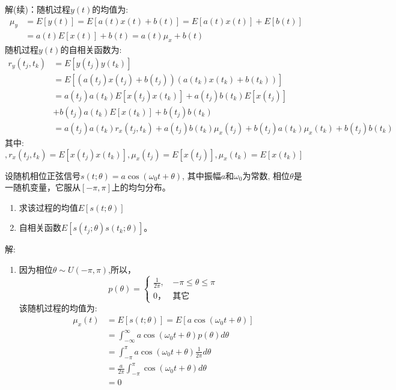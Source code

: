 \begin{frame}
解(续)：随机过程$y(t)$的均值为:
\begin{align*}
\mu_y&=E[y(t)]=E[a(t)x(t)+b(t)]=E[a(t)x(t)]+E[b(t)]\\
&=a(t)E[x(t)]+b(t)=a(t)\mu_x+b(t)
\end{align*}
随机过程$y(t)$的自相关函数为:
\begin{align*}
r_y(t_j,t_k)&=E[y(t_j)y(t_k)]\\
&=E[(a(t_j)x(t_j)+b(t_j))(a(t_k)x(t_k)+b(t_k))]\\
&=a(t_j)a(t_k)E[x(t_j)x(t_k)]+a(t_j)b(t_k)E[x(t_j)]\\
&+b(t_j)a(t_k)E[x(t_k)]+b(t_j)b(t_k)\\
&=a(t_j)a(t_k)r_x(t_j,t_k)+a(t_j)b(t_k)\mu_x(t_j)+b(t_j)a(t_k)\mu_x(t_k)+b(t_j)b(t_k)
\end{align*}
其中: $,r_x(t_j,t_k)=E[x(t_j)x(t_k)],\mu_x(t_j)=E[x(t_j)], \mu_x(t_k)=E[x(t_k)]$
\end{frame}

\begin{frame}
\begin{example}
	设随机相位正弦信号$s(t; \theta)=a\cos(\omega_0 t+\theta)$, 其中振幅$a$和$\omega_0$为常数, 相位$\theta$是一随机变量，它服从$[-\pi,\pi]$上的均匀分布。
	\begin{enumerate}
		\item 求该过程的均值$E[s(t; \theta)]$
		\item 自相关函数$E[s(t_j; \theta)s(t_k; \theta)]$。
	\end{enumerate}
\end{example}
\end{frame}

\begin{frame}
解:
\begin{enumerate}
\item 因为相位$\theta\sim U(-\pi,\pi)$,所以，
$$p(\theta)=\begin{cases}
\frac{1}{2\pi}, & -\pi\le\theta\le\pi\\
0， &\text{其它}
\end{cases} $$ 
该随机过程的均值为:
\begin{align*}
\mu_{x}(t)&=E[s(t; \theta)]=E[a\cos(\omega_0t+\theta)]\\
&=\int_{-\infty}^{\infty}a\cos(\omega_0t+\theta)p(\theta)d\theta\\
&=\int_{-\pi}^{\pi}a\cos(\omega_0t+\theta)\frac{1}{2\pi}d\theta\\
&=\frac{a}{2\pi}\int_{-\pi}^{\pi}\cos(\omega_0t+\theta)d\theta\\
&=0
\end{align*}
\end{enumerate}
\end{frame}


